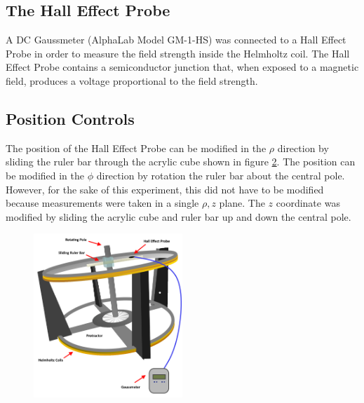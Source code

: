 \documentclass[a4paper]{article}
\begin{document}
\begin{figure}[h]
\centering
\label{helmholtz_circuit}
\end{figure}

\subsection{The Hall Effect Probe}

\qq A DC Gaussmeter (AlphaLab Model GM-1-HS) was connected to a Hall Effect Probe in
order to measure the field strength inside the Helmholtz coil. The Hall Effect
Probe contains a semiconductor junction that, when exposed to a magnetic field,
produces a voltage proportional to the field strength.

\subsection{Position Controls}

\qq The position of the Hall Effect Probe can be modified in the $\rho$ direction by
sliding the ruler bar through the acrylic cube shown in figure
\ref{helmholtz_diagram}. The position can be modified in the $\phi$ direction by
rotation the ruler bar about the central pole. However, for the sake of this
experiment, this did not have to be modified because measurements were taken in
a single $\rho , z$ plane. The $z$ coordinate was modified by sliding the
acrylic cube and ruler bar up and down the central pole.

\begin{figure}[h]
\centering
\includegraphics[width=0.5\textwidth]{helmholtz_diagram.png}
\label{helmholtz_diagram}
\end{figure}
\end{document}
